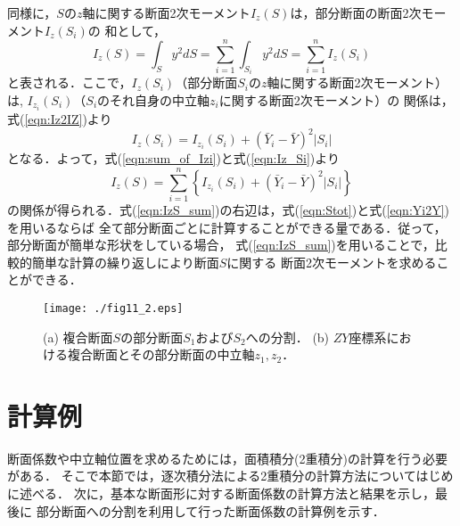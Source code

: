 \documentclass[10pt,a4j]{jarticle}
\begin{document}
同様に，$S$の$z$軸に関する断面2次モーメント$I_z(S)$は，部分断面の断面2次モーメント$I_z(S_i)$の
和として，
\begin{equation}
	I_z(S)=\int_S y^2 dS=\sum_{i=1}^n\int_{S_i} y^2dS=\sum_{i=1}^n I_z(S_i)
	\label{eqn:sum_of_Izi}
\end{equation}
と表される．ここで，$I_z(S_i)$（部分断面$S_i$の$z$軸に関する断面2次モーメント）は,
$I_{z_i}(S_i)$（$S_i$のそれ自身の中立軸$z_i$に関する断面2次モーメント）の
関係は，式(\ref{eqn:Iz2IZ})より
\begin{equation}
	I_z(S_i)=I_{z_i}(S_i)+\left( \bar Y_i-\bar{Y} \right)^2 \left|S_i\right|
	\label{eqn:Iz_Si}
\end{equation}
となる．よって，式(\ref{eqn:sum_of_Izi})と式(\ref{eqn:Iz_Si})より
\begin{equation}
	I_z(S)=
	\sum_{i=1}^n\left\{
		I_{z_i}(S_i)+\left( \bar Y_i-\bar{Y} \right)^2 \left|S_i\right|
	\right\}
	\label{eqn:IzS_sum}
\end{equation}
の関係が得られる．式(\ref{eqn:IzS_sum})の右辺は，式(\ref{eqn:Stot})と式(\ref{eqn:Yi2Y})を用いるならば
全て部分断面ごとに計算することができる量である．従って，部分断面が簡単な形状をしている場合，
式(\ref{eqn:IzS_sum})を用いることで，比較的簡単な計算の繰り返しにより断面$S$に関する
断面2次モーメントを求めることができる．
\begin{figure}[h]
	\begin{center}
	\texttt{[image: ./fig11\_2.eps]} 
	\end{center}
	\caption{
		(a) 複合断面$S$の部分断面$S_1$および$S_2$への分割．
		(b) $ZY$座標系における複合断面とその部分断面の中立軸$z_1,z_2$．
	} 
	\label{fig:fig11_2}
\end{figure}
\section{計算例}
断面係数や中立軸位置を求めるためには，面積積分(2重積分)の計算を行う必要がある．
そこで本節では，逐次積分法による2重積分の計算方法についてはじめに述べる．
次に，基本な断面形に対する断面係数の計算方法と結果を示し，最後に
部分断面への分割を利用して行った断面係数の計算例を示す．
\end{document}
